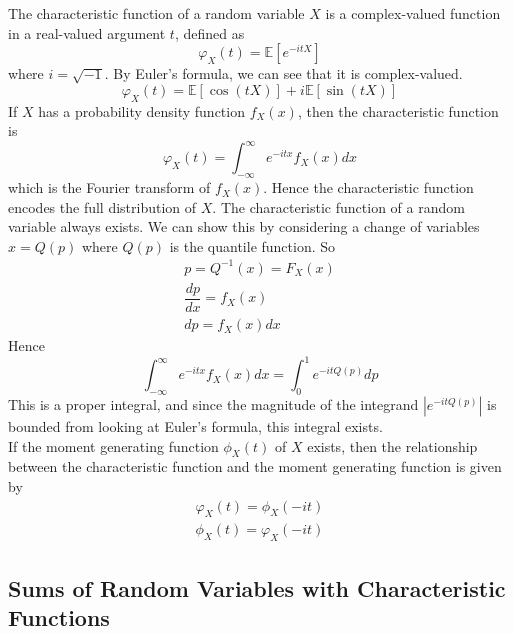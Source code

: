 \documentclass[11pt]{report} %
\begin{document}
The characteristic function of a random variable $X$ is a complex-valued function in a real-valued argument $t$, defined as
\begin{equation}
\varphi_{X}\left(t\right) = \mathbb{E}\left[e^{-itX}\right]
\end{equation}
where $i = \sqrt{-1}$. By Euler's formula, we can see that it is complex-valued.
\begin{equation}
\varphi_{X}\left(t\right) = \mathbb{E}\left[\cos\left(tX\right)\right] + i\mathbb{E}\left[\sin\left(tX\right)\right]
\end{equation}
If $X$ has a probability density function $f_{X}\left(x\right)$, then the characteristic function is
\begin{equation}
\varphi_{X}\left(t\right) = \int_{-\infty}^{\infty}e^{-itx}f_{X}\left(x\right)dx
\end{equation}
which is the Fourier transform of $f_{X}\left(x\right)$. Hence the characteristic function encodes the full distribution of $X$. The characteristic function of a random variable always exists. We can show this by considering a change of variables $x = Q\left(p\right)$ where $Q\left(p\right)$ is the quantile function. So
\begin{gather}
p = Q^{-1}\left(x\right) = F_{X}\left(x\right) \\
\dfrac{dp}{dx} = f_{X}\left(x\right) \\
dp = f_{X}\left(x\right)dx
\end{gather}
Hence
\begin{equation}
\int_{-\infty}^{\infty}e^{-itx}f_{X}\left(x\right)dx = \int_{0}^{1}e^{-itQ\left(p\right)}dp
\end{equation}
This is a proper integral, and since the magnitude of the integrand $\left|e^{-itQ\left(p\right)}\right|$ is bounded from looking at Euler's formula, this integral exists. \\

If the moment generating function $\phi_{X}\left(t\right)$ of $X$ exists, then the relationship between the characteristic function and the moment generating function is given by
\begin{gather}
\varphi_{X}\left(t\right) = \phi_{X}\left(-it\right) \\
\phi_{X}\left(t\right) = \varphi_{X}\left(-it\right)
\end{gather}

\subsection{Sums of Random Variables with Characteristic Functions}
\end{document}

